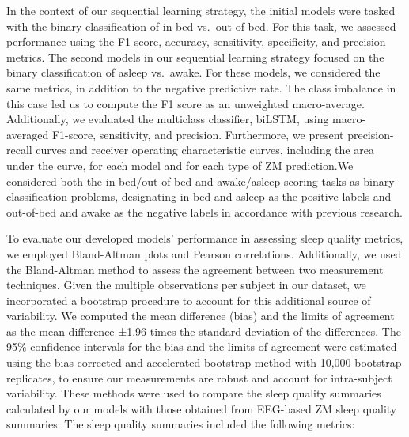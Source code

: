 \documentclass[
  super,
  preprint,
  3p]{elsarticle}
\begin{document}
In the context of our sequential learning strategy, the initial models
were tasked with the binary classification of in-bed vs.~out-of-bed. For
this task, we assessed performance using the F1-score, accuracy,
sensitivity, specificity, and precision metrics. The second models in
our sequential learning strategy focused on the binary classification of
asleep vs.~awake. For these models, we considered the same metrics, in
addition to the negative predictive rate. The class imbalance in this
case led us to compute the F1 score as an unweighted macro-average.
Additionally, we evaluated the multiclass classifier, biLSTM, using
macro-averaged F1-score, sensitivity, and precision. Furthermore, we
present precision-recall curves and receiver operating characteristic
curves, including the area under the curve, for each model and for each
type of ZM prediction.We considered both the in-bed/out-of-bed and
awake/asleep scoring tasks as binary classification problems,
designating in-bed and asleep as the positive labels and out-of-bed and
awake as the negative labels in accordance with previous
research\citep{hjorth2012, kushida2001}.

To evaluate our developed models' performance in assessing sleep quality
metrics, we employed Bland-Altman plots and Pearson correlations.
Additionally, we used the Bland-Altman method to assess the agreement
between two measurement techniques. Given the multiple observations per
subject in our dataset, we incorporated a bootstrap procedure to account
for this additional source of variability. We computed the mean
difference (bias) and the limits of agreement as the mean difference
±1.96 times the standard deviation of the differences. The 95\%
confidence intervals for the bias and the limits of agreement were
estimated using the bias-corrected and accelerated bootstrap method with
10,000 bootstrap replicates, to ensure our measurements are robust and
account for intra-subject variability. These methods were used to
compare the sleep quality summaries calculated by our models with those
obtained from EEG-based ZM sleep quality summaries. The sleep quality
summaries included the following metrics:
\end{document}
